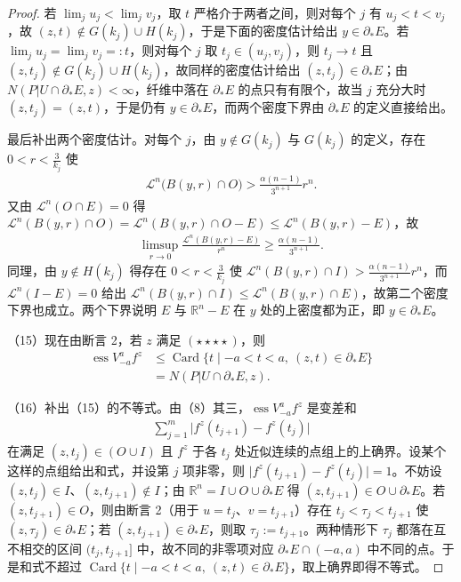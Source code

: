 \documentclass[../../main.tex]{subfiles}%
\begin{document}
\begin{proof}
若 $\lim_ju_j<\lim_jv_j$，取 $t$ 严格介于两者之间，则对每个 $j$ 有 $u_j<t<v_j$，故 $(z,t)\notin G(k_j)\cup H(k_j)$，于是下面的密度估计给出 $y\in\partial_*E$。若 $\lim_ju_j=\lim_jv_j=:t$，则对每个 $j$ 取 $t_j\in(u_j,v_j)$，则 $t_j\to t$ 且 $(z,t_j)\notin G(k_j)\cup H(k_j)$，故同样的密度估计给出 $(z,t_j)\in\partial_*E$；由 $N(P|U\cap\partial_*E,z)<\infty$，纤维中落在 $\partial_*E$ 的点只有有限个，故当 $j$ 充分大时 $(z,t_j)=(z,t)$，于是仍有 $y\in\partial_*E$，而两个密度下界由 $\partial_*E$ 的定义直接给出。

最后补出两个密度估计。对每个 $j$，由 $y\notin G(k_j)$ 与 $G(k_j)$ 的定义，存在 $0<r<\frac3{k_j}$ 使
\begin{align*}
\mathcal{L}^n\bigl(B(y,r)\cap O\bigr)>\frac{\alpha(n-1)}{3^{n+1}}r^n .
\end{align*}
又由 $\mathcal{L}^n(O\cap E)=0$ 得 $\mathcal{L}^n(B(y,r)\cap O)=\mathcal{L}^n(B(y,r)\cap O-E)\leqslant\mathcal{L}^n(B(y,r)-E)$，故
\begin{align*}
\limsup_{r\to0}\frac{\mathcal{L}^n(B(y,r)-E)}{r^n}\geqslant\frac{\alpha(n-1)}{3^{n+1}} .
\end{align*}
同理，由 $y\notin H(k_j)$ 得存在 $0<r<\frac3{k_j}$ 使 $\mathcal{L}^n(B(y,r)\cap I)>\frac{\alpha(n-1)}{3^{n+1}}r^n$，而 $\mathcal{L}^n(I-E)=0$ 给出 $\mathcal{L}^n(B(y,r)\cap I)\leqslant\mathcal{L}^n(B(y,r)\cap E)$，故第二个密度下界也成立。两个下界说明 $E$ 与 $\mathbb{R}^n-E$ 在 $y$ 处的上密度都为正，即 $y\in\partial_*E$。

（15）现在由断言 2，若 $z$ 满足 $(\star\star\star\star)$，则
\begin{align*}
\operatorname{ess}V_{-a}^{a}f^z&\leqslant\operatorname{Card}\bigl\{t\mid-a<t<a,\ (z,t)\in\partial_*E\bigr\}\\
&=N(P|U\cap\partial_*E,z).
\end{align*}

（16）补出（15）的不等式。由（8）其三，$\operatorname{ess}V_{-a}^{a}f^z$ 是变差和
\begin{align*}
\sum_{j=1}^{m}\lvert f^z(t_{j+1})-f^z(t_j)\rvert
\end{align*}
在满足 $(z,t_j)\in(O\cup I)$ 且 $f^z$ 于各 $t_j$ 处近似连续的点组上的上确界。设某个这样的点组给出和式，并设第 $j$ 项非零，则 $\lvert f^z(t_{j+1})-f^z(t_j)\rvert=1$。不妨设 $(z,t_j)\in I$、$(z,t_{j+1})\notin I$；由 $\mathbb{R}^n=I\cup O\cup\partial_*E$ 得 $(z,t_{j+1})\in O\cup\partial_*E$。若 $(z,t_{j+1})\in O$，则由断言 2（用于 $u=t_j$、$v=t_{j+1}$）存在 $t_j<\tau_j<t_{j+1}$ 使 $(z,\tau_j)\in\partial_*E$；若 $(z,t_{j+1})\in\partial_*E$，则取 $\tau_j:=t_{j+1}$。两种情形下 $\tau_j$ 都落在互不相交的区间 $(t_j,t_{j+1}]$ 中，故不同的非零项对应 $\partial_*E\cap(-a,a)$ 中不同的点。于是和式不超过 $\operatorname{Card}\{t\mid-a<t<a,\ (z,t)\in\partial_*E\}$，取上确界即得不等式。


\end{proof}
\end{document}
